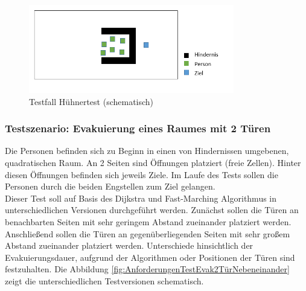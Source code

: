 \begin{figure}[htpb]
	\centering
	\includegraphics[width=0.8\textwidth]{abbildungen/Test_Huehner.png}
	\caption{Testfall Hühnertest (schematisch)}
	\label{fig:AnforderungenTest_Hühner}
\end{figure}
 
\subsubsection{Testszenario: Evakuierung eines Raumes mit 2 Türen}
\label{Anforderungen:Evakuierung2}
Die Personen befinden sich zu Beginn in einen von Hindernissen umgebenen, quadratischen Raum. An 2 Seiten sind Öffnungen platziert (freie Zellen). Hinter diesen Öffnungen befinden sich jeweils Ziele. Im Laufe des Tests sollen die Personen durch die beiden Engstellen zum Ziel gelangen. \\
Dieser Test soll auf Basis des Dijkstra und Fast-Marching Algorithmus in unterschiedlichen Versionen durchgeführt werden. Zunächst sollen die Türen an benachbarten Seiten mit sehr geringem Abstand zueinander platziert werden. Anschließend sollen die Türen an gegenüberliegenden Seiten mit sehr großem Abstand zueinander platziert werden. Unterschiede hinsichtlich der Evakuierungsdauer, aufgrund der Algorithmen oder Positionen der Türen sind festzuhalten. Die Abbildung \ref{fig:AnforderungenTestEvak2TürNebeneinander} zeigt die unterschiedlichen Testversionen schematisch.


